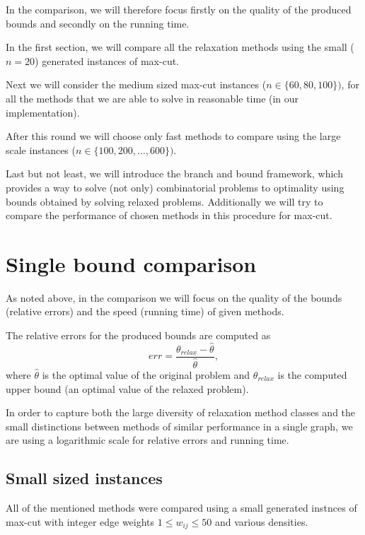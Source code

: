 \documentclass[12pt]{book}
\theoremstyle{definition}
\begin{document}
In the comparison, we will therefore focus firstly on the quality of the produced bounds and secondly on the running time.

In the first section, we will compare all the relaxation methods using the small ($n=20$) generated instances of max-cut. 

Next we will consider the medium sized max-cut instances ($n\in\{60, 80, 100\})$, for all the methods that we are able to solve in reasonable time  (in our implementation).

After this round we will choose only fast methods to compare using the large scale instances ($n\in\{100,200,\dots, 600\})$. 


Last but not least, we will introduce the branch and bound framework, which provides a way to solve (not only) combinatorial problems to optimality using bounds obtained by solving relaxed problems. Additionally we will try to compare the performance of chosen methods in this procedure for max-cut.

\section{Single bound comparison}

As noted above, in the comparison we will focus on the quality of the bounds (relative errors) and the speed (running time) of given methods.

The relative errors for the produced bounds are computed as 
\begin{equation}
\label{relative_error}
err = \frac{\theta_{relax} - \hat{\theta}}{\hat{\theta}},
\end{equation}
where $\hat{\theta}$ is the optimal value of the original problem and $\theta_{relax}$ is the computed upper bound (an optimal value of the relaxed problem). 

In order to capture both the large diversity of relaxation method classes and the small distinctions between methods of similar performance in a single graph, we are using a logarithmic scale for relative errors and running time. 



\subsection{Small sized instances}
All of the mentioned methods were compared using a small generated instnces of max-cut with integer edge weights $1\leq w_{ij}\leq 50$
and various densities. 
\end{document}
